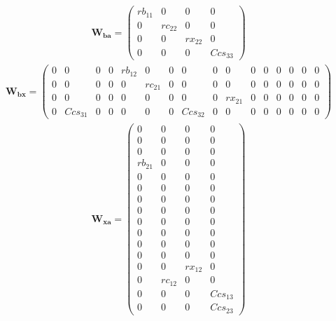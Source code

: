 \begin{multline} \mathbf{W_{ba}} = \left(\begin{smallmatrix} rb_{11} &
0 & 0 & 0 \\ 0 & rc_{22} & 0 & 0 \\ 0 & 0 & rx_{22} & 0 \\ 0 & 0 & 0 &
Ccs_{33} \end{smallmatrix}\right) \end{multline}
\begin{multline} \mathbf{W_{bx}} = \left(\begin{smallmatrix} 0 & 0 & 0
& 0 & rb_{12} & 0 & 0 & 0 & 0 & 0 & 0 & 0 & 0 & 0 & 0 & 0 \\ 0 & 0 & 0
& 0 & 0 & rc_{21} & 0 & 0 & 0 & 0 & 0 & 0 & 0 & 0 & 0 & 0 \\ 0 & 0 & 0
& 0 & 0 & 0 & 0 & 0 & 0 & rx_{21} & 0 & 0 & 0 & 0 & 0 & 0 \\ 0 &
Ccs_{31} & 0 & 0 & 0 & 0 & 0 & Ccs_{32} & 0 & 0 & 0 & 0 & 0 & 0 & 0 &
0 \end{smallmatrix}\right) \end{multline}
\begin{multline} \mathbf{W_{xa}} = \left(\begin{smallmatrix} 0 & 0 & 0
& 0 \\ 0 & 0 & 0 & 0 \\ 0 & 0 & 0 & 0 \\ rb_{21} & 0 & 0 & 0 \\ 0 & 0
& 0 & 0 \\ 0 & 0 & 0 & 0 \\ 0 & 0 & 0 & 0 \\ 0 & 0 & 0 & 0 \\ 0 & 0 &
0 & 0 \\ 0 & 0 & 0 & 0 \\ 0 & 0 & 0 & 0 \\ 0 & 0 & 0 & 0 \\ 0 & 0 &
rx_{12} & 0 \\ 0 & rc_{12} & 0 & 0 \\ 0 & 0 & 0 & Ccs_{13} \\ 0 & 0 &
0 & Ccs_{23} \end{smallmatrix}\right) \end{multline}
